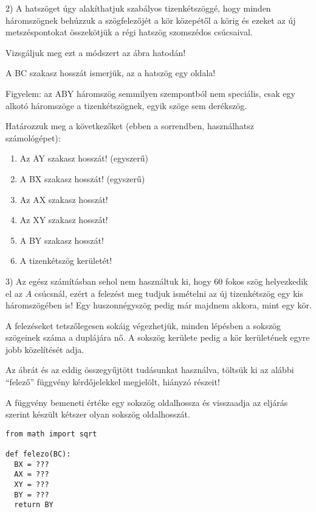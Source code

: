 \documentclass[a4paper,12pt]{article}
\begin{document}
2) A hatszöget úgy alakíthatjuk szabályos tizenkétszöggé, hogy minden
háromszögnek behúzzuk a szögfelezőjét a kör közepétől a körig és
ezeket az új metszéspontokat összekötjük a régi hatszög szomszédos
csúcsaival.

Vizsgáljuk meg ezt a módszert az ábra hatodán!


A BC szakasz hosszát ismerjük, az a hatszög egy oldala!

Figyelem: az ABY háromszög semmilyen szempontból nem speciális, csak egy
alkotó háromszöge a tizenkétszögnek, egyik szöge sem derékszög.

Határozzuk meg a következőket (ebben a sorrendben, használhatsz számológépet):

\begin{enumerate}[label=\alph*)]
\item Az AY szakasz hosszát! (egyszerű)
\item A BX szakasz hosszát! (egyszerű)
\item Az AX szakasz hosszát!
\item Az XY szakasz hosszát!
\item A BY szakasz hosszát!
\item A tizenkétszög kerületét!
\end{enumerate}

\newpage

3) Az egész számításban sehol nem használtuk ki, hogy 60 fokos szög
helyezkedik el az $A$ csúcsnál, ezért a felezést meg tudjuk ismételni
az új tizenkétszög egy kis háromszögében is!  Egy huszonnégyszög pedig
már majdnem akkora, mint egy kör.


A felezéseket tetszőlegesen sokáig végezhetjük, minden lépésben
a sokszög szögeinek száma a duplájára nő.  A sokszög kerülete pedig a
kör kerületének egyre jobb közelítését adja.

Az ábrát és az eddig összegyűjtött tudásunkat használva, töltsük ki az
alábbi ``felező'' függvény kérdőjelekkel megjelölt, hiányzó részeit!

A függvény bemeneti értéke egy sokszög oldalhossza és visszaadja az
eljárás szerint készült kétszer olyan sokszög oldalhosszát.

\begin{verbatim}
from math import sqrt

def felezo(BC):
  BX = ???
  AX = ???
  XY = ???
  BY = ???
  return BY
\end{verbatim}
\end{document}
